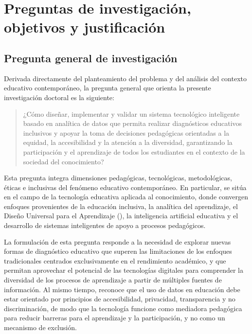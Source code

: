 \chapter{Preguntas de investigación, objetivos y justificación}

\begin{refsection}

\section{Pregunta general de investigación}

Derivada directamente del planteamiento del problema y del análisis del contexto educativo contemporáneo, la pregunta general que orienta la presente investigación doctoral es la siguiente:

\begin{quote}
¿Cómo diseñar, implementar y validar un sistema tecnológico inteligente basado en analítica de datos que permita realizar diagnósticos educativos inclusivos y apoyar la toma de decisiones pedagógicas orientadas a la equidad, la accesibilidad y la atención a la diversidad, garantizando la participación y el aprendizaje de todos los estudiantes en el contexto de la sociedad del conocimiento?
\end{quote}

Esta pregunta integra dimensiones pedagógicas, tecnológicas, metodológicas, éticas e inclusivas del fenómeno educativo contemporáneo. En particular, se sitúa en el campo de la tecnología educativa aplicada al conocimiento, donde convergen enfoques provenientes de la educación inclusiva, la analítica del aprendizaje, el Diseño Universal para el Aprendizaje (\DUA), la inteligencia artificial educativa y el desarrollo de sistemas inteligentes de apoyo a procesos pedagógicos.

La formulación de esta pregunta responde a la necesidad de explorar nuevas formas de diagnóstico educativo que superen las limitaciones de los enfoques tradicionales centrados exclusivamente en el rendimiento académico, y que permitan aprovechar el potencial de las tecnologías digitales para comprender la diversidad de los procesos de aprendizaje a partir de múltiples fuentes de información. Al mismo tiempo, reconoce que el uso de datos en educación debe estar orientado por principios de accesibilidad, privacidad, transparencia y no discriminación, de modo que la tecnología funcione como mediadora pedagógica para reducir barreras para el aprendizaje y la participación, y no como un mecanismo de exclusión.


\end{refsection}
